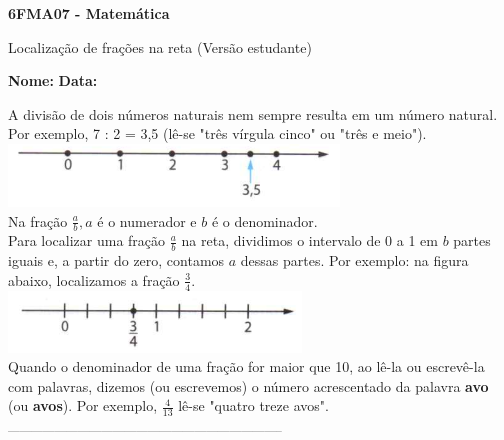 \documentclass[a4paper,14pt]{article}
\begin{document}
	
	\noindent\textbf{6FMA07 - Matemática} 
	
	\begin{center}Localização de frações na reta (Versão estudante)
	\end{center}
	
	\noindent\textbf{Nome:} \underline{\hspace{10cm}}
	\noindent\textbf{Data:} \underline{\hspace{4cm}}
	
	
	\begin{multicols}{2}
		\noindent A divisão de dois números naturais nem sempre resulta em um número natural. Por exemplo, 7 : 2 = 3,5 (lê-se "três vírgula cinco" ou "três e meio"). \\
		\includegraphics[width=1\linewidth]{6FMA07_imagens/imagem01} \\
		Na fração $\frac{a}{b}, a$ é o numerador e $b$ é o denominador. \\
		Para localizar uma fração $\frac{a}{b}$ na reta, dividimos o intervalo de 0 a 1 em $b$ partes iguais e, a partir do zero, contamos $a$ dessas partes. Por exemplo: na figura abaixo, localizamos a fração $\frac{3}{4}$. \\
		\includegraphics[width=1\linewidth]{6FMA07_imagens/imagem02} \\
		Quando o denominador de uma fração for maior que 10, ao lê-la ou escrevê-la com palavras, dizemos (ou escrevemos) o número acrescentado da palavra \textbf{avo} (ou \textbf{avos}). Por exemplo, $\frac{4}{13}$ lê-se "quatro treze avos".
		\noindent\textsubscript{-----------------------------------------------------------------------}
		\begin{enumerate} 

\end{enumerate}
\end{multicols}
\end{document}
